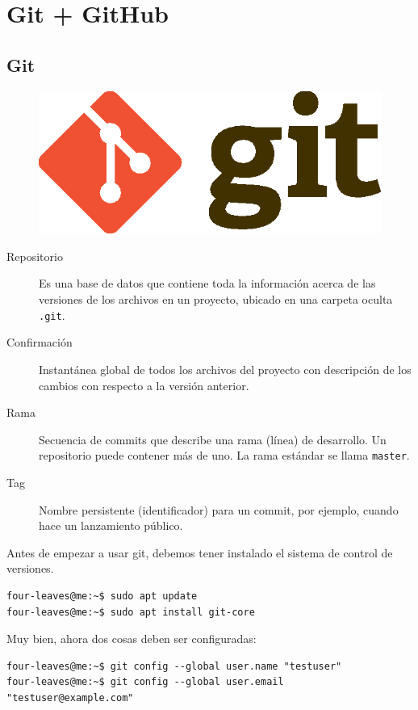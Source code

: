 \chapter{Git + GitHub}

\section{Git}

\lipsum[1]
\begin{figure}
	\includegraphics[width=0.24\paperwidth]{./img/git}
\end{figure}
\lipsum[1]

\begin{description}
	\item[Repositorio] Es una base de datos que contiene toda la información acerca de las versiones de los archivos en un proyecto, ubicado en una carpeta oculta \lstinline|.git|.
	\item[Confirmación] Instantánea global de todos los archivos del proyecto con descripción de los cambios con respecto a la versión anterior.
	\item[Rama] Secuencia de commits que describe una rama (línea) de desarrollo. Un repositorio puede contener más de uno. La rama estándar se llama \lstinline|master|.
	\item[Tag] Nombre persistente (identificador) para un commit, por ejemplo, cuando hace un lanzamiento público.
\end{description}

Antes de empezar a usar git, debemos tener instalado el sistema de control de versiones.
\begin{lstlisting}
four-leaves@me:~$ sudo apt update
four-leaves@me:~$ sudo apt install git-core
\end{lstlisting}
Muy bien, ahora dos cosas deben ser configuradas:
\begin{lstlisting}
four-leaves@me:~$ git config --global user.name "testuser"
four-leaves@me:~$ git config --global user.email "testuser@example.com"
\end{lstlisting}

